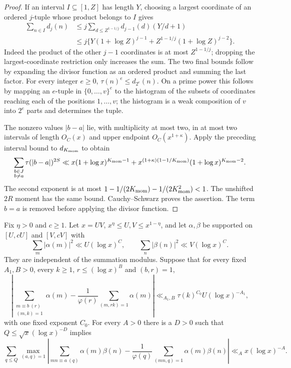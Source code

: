 \begin{proof}
If an interval $I\subseteq[1,Z]$ has length $Y$, choosing a largest
coordinate of an ordered $j$-tuple whose product belongs to $I$ gives
\begin{align*}
 \sum_{n\in I}d_j(n)
 &\le j\sum_{d\le Z^{1-1/j}}d_{j-1}(d)(Y/d+1)\\
 &\le j\{Y(1+\log Z)^{j-1}
              +Z^{1-1/j}(1+\log Z)^{j-2}\}.
\end{align*}
Indeed the product of the other $j-1$ coordinates is at most
$Z^{1-1/j}$; dropping the largest-coordinate restriction only increases
the sum.  The two final bounds follow by expanding the divisor function
as an ordered product and summing the last factor.
For every integer $e\ge0$,
$\tau(n)^e\le d_{2^e}(n)$.  On a prime power this follows by mapping
an $e$-tuple in $\{0,\ldots,v\}^e$ to the histogram of the subsets
of coordinates reaching each of the positions $1,\ldots,v$; the
histogram is a weak composition of $v$ into $2^e$ parts and determines
the tuple.

The nonzero values $|b-a|$ lie, with multiplicity at most two, in at most
two intervals of length $O_C(x)$ and upper endpoint $O_C(x^{1+\kappa})$.
Apply the preceding interval bound to $d_{K_{\rm mom}}$ to obtain
\[
 \sum_{\substack{b\in J\\b\ne a}}\tau(|b-a|)^{2S}
 \ll x(1+\log x)^{K_{\rm mom}-1}
       +x^{(1+\kappa)(1-1/K_{\rm mom})}(1+\log x)^{K_{\rm mom}-2}.
\]
The second exponent is at most $1-1/(2K_{\rm mom})-1/(2K_{\rm mom}^2)<1$.
The unshifted $2R$ moment has the same bound.
Cauchy--Schwarz proves the assertion.  The term $b=a$ is removed
before applying the divisor function.
\end{proof}

\begin{lemma}
\label{coef:low-rank-BV}
Fix $\eta>0$ and $c\ge1$. Let $x=UV$,
$x^\eta\le U,V\le x^{1-\eta}$, and let $\alpha,\beta$ be supported
on $[U,cU]$ and $[V,cV]$ with
\[
 \sum_m|\alpha(m)|^2\ll U(\log x)^C,\qquad
 \sum_n|\beta(n)|^2\ll V(\log x)^C.
\]
They are independent of the summation modulus.  Suppose that for every
fixed $A_1,B>0$, every $k\ge1$, $r\le(\log x)^B$ and $(b,r)=1$,
\begin{equation}
 \left|\sum_{\substack{m\equiv b\ (r)\\(m,k)=1}}\alpha(m)
 -\frac1{\varphi(r)}\sum_{(m,rk)=1}\alpha(m)\right|
 \ll_{A_1,B}\tau(k)^{C_0}U(\log x)^{-A_1},
 \label{coef:small-aux-SW}
\end{equation}
with one fixed exponent $C_0$.  For every $A>0$ there is a $D>0$ such
that $Q\le\sqrt x(\log x)^{-D}$ implies
\[
 \sum_{q\le Q}\max_{(a,q)=1}
 \left|\sum_{mn\equiv a\ (q)}\alpha(m)\beta(n)
 -\frac1{\varphi(q)}\sum_{(mn,q)=1}\alpha(m)\beta(n)\right|
 \ll_A x(\log x)^{-A}.
\]
\end{lemma}

